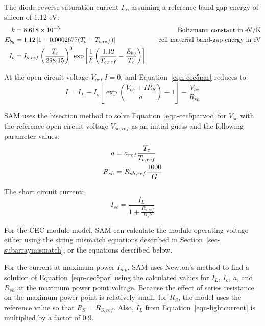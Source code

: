 \documentclass[12pt,letterpaper]{article}
\begin{document}
The diode reverse saturation current $I_o$, assuming a reference band-gap energy of silicon of 1.12 eV:
\begin{align}
k &= 8.618 \times 10^{-5} &\quad\text{Boltzmann constant in eV/K} \notag\\
E_{bg} &= 1.12 \left[1-0.0002677(T_c-T_{c,ref})\right] &\quad\text{cell material band-gap energy in eV}\notag\\
I_o &= I_{o,ref} \left( \frac{T_c}{298.15} \right)^3 \exp\left[ \frac{1}{k} \left( \frac{1.12}{T_{c,ref}} - \frac{E_{bg}}{T_c} \right) \right] &
\end{align}

At the open circuit voltage $V_{oc}$, $I=0$, and Equation~\ref{eqn-cec5par} reduces to:
\begin{equation}\label{eqn-cec5parvoc}
I = I_L - I_o \left[ \exp\left(  \frac{V_{oc}+IR_S}{a} \right) -1 \right] - \frac{V_{oc}}{R_{sh}}
\end{equation}

SAM uses the bisection method to solve Equation~\ref{eqn-cec5parvoc} for $V_{oc}$ with the reference open circuit voltage $V_{oc,ref}$ as an initial guess and the following parameter values:
\begin{align} 
a &= a_{ref} \frac{T_c}{T_{c,ref}} \notag\\
R_{sh} &= R_{sh,ref} \frac{1000}{G}
\end{align}

The short circuit current:
\begin{equation} \label{eqn-cecisc}
I_{sc} = \frac{I_L }{1+\frac{R_{s,ref}}{R_sh}}
\end{equation}

For the CEC module model, SAM can calculate the module operating voltage either using the string mismatch equations described in Section~\ref{sec-subarraymismatch}, or the equations described below.%


For the current at maximum power $I_{mp}$, SAM uses Newton's method to find a solution of Equation~\ref{eqn-cec5par} using the calculated values for $I_L$, $I_o$, $a$, and $R_{sh}$ at the maximum power point voltage. Because the effect of series resistance on the maximum power point is relatively small, for $R_S$, the model uses the reference value so that $R_S=R_{S,ref}$. Also, $I_L$ from Equation~\ref{eqn-lightcurrent} is multiplied by a factor of 0.9.
\end{document}
